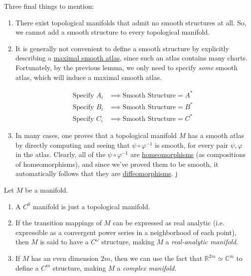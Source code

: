 \documentclass{article}
\newcounter{definition}[section]
\begin{document}
    Three final things to mention:
    \begin{enumerate}
      \item There exist topological manifolds that admit no smooth structures at all. So, we cannot add a smooth structure to every topological manifold. 

      \item It is generally not convenient to define a smooth structure by explicitly describing a \hyperref[def:maximal-smooth-atlas]{maximal smooth atlas}, since such an atlas contains many charts. Fortunately, by the previous lemma, we only need to specify \textit{some} smooth atlas, which will induce a maximal smooth atlas. 

      \begin{align*}
          \text{Specify } A_i & \implies \text{Smooth Structure} = A^*\\
          \text{Specify } B_i & \implies \text{Smooth Structure} = B^*\\
          \text{Specify } C_i & \implies \text{Smooth Structure} = C^*
      \end{align*}

      \item In many cases, one proves that a topological manifold $M$ has a smooth atlas by directly computing and seeing that $\psi \circ \varphi^{-1}$ is smooth, for every pair $\psi, \varphi$ in the atlas. Clearly, all of the $\psi \circ \varphi^{-1}$ are \hyperref[pst-def:homeomorphism]{homeomorphisms} (as compositions of homeomorphisms), and since we've proved them to be smooth, it automatically follows that they are \hyperref[def:diffeomorphism]{diffeomorphisms}. j
    \end{enumerate}

    \begin{definition}
      \label{def:other-classes-of-manifolds}
 Let $M$ be a manifold. 
      \begin{enumerate}
        \item A $C^0$ manifold is just a topological manifold. 
        \item If the transition mappings of $M$ can be expressed as real analytic (i.e. expressible as a convergent power series in a neighborhood of each point), then $M$ is said to have a $C^\omega$ structure, making $M$ a \textit{real-analytic manifold}. 
        \item If $M$ has an even dimension $2m$, then we can use the fact that $\mathbb{R}^{2m} \simeq \mathbb{C}^m$ to define a $C^m$ structure, making $M$ a \textit{complex manifold}. 
      \end{enumerate}
    \end{definition}
\end{document}
